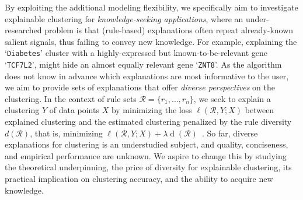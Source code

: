 \documentclass[a4paper,11pt]{article}
\begin{document}
By exploiting the additional modeling flexibility, 
we specifically aim to investigate explainable clustering for \emph{knowledge-seeking applications}, 
where an under-researched problem is that (rule-based) explanations 
often repeat already-known salient signals, thus failing to convey new knowledge.
For example, 
explaining the `\texttt{\small Diabetes}' cluster with a highly-expressed 
but known-to-be-relevant gene `\texttt{\small TCF7L2}', 
might hide an almost equally relevant gene `\texttt{\small ZNT8}'.  
As the algorithm does not know in advance which explanations are most informative to the user, 
we aim to provide sets of explanations that offer \emph{diverse perspectives} on the clustering.
In the context of rule sets $\mathcal{R} = \{r_1, \dots, r_n\}$, 
we seek to explain a clustering $Y$ of data points $X$ 
by minimizing the loss $\ell(\mathcal{R},Y;X)$ between explained clustering and the estimated clustering 
penalized by the rule diversity~$d(\mathcal{R})$, 
that is, minimizing $\ell(\mathcal{R},Y;X) + \lambda \operatorname{d}(\mathcal{R})$~\cite{zhang2020diverse}.
So far, diverse explanations for clustering is an understudied subject, and quality, conciseness, and empirical performance are unknown. 
We aspire to change this by studying the theoretical underpinning, the price of diversity for explainable clustering, its practical implication on clustering accuracy, and the ability to acquire new knowledge. 
\end{document}
